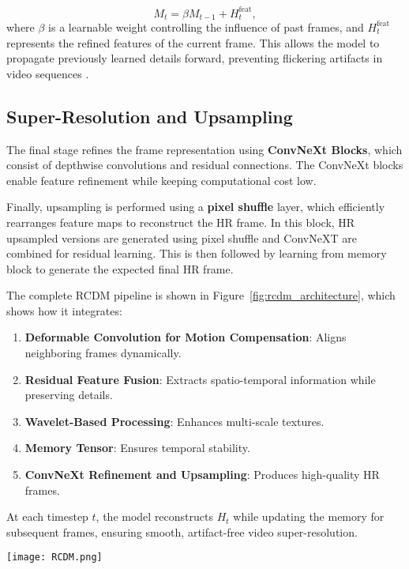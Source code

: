 \documentclass[11pt]{article}
\begin{document}
\begin{equation}
    M_t = \beta M_{t-1} + H_t^{\text{feat}},
    \label{eq:memory_update}
\end{equation}
where $\beta$ is a learnable weight controlling the influence of past frames, and $H_t^{\text{feat}}$ represents the refined features of the current frame. This allows the model to propagate previously learned details forward, preventing flickering artifacts in video sequences\cite{Chiche_2022_CVPR} \cite{chu2020learningtemporalcoherenceselfsupervision}.

\subsection{Super-Resolution and Upsampling}
The final stage refines the frame representation using \textbf{ConvNeXt Blocks}, which consist of depthwise convolutions and residual connections.\cite{liu2022convnext} The ConvNeXt blocks enable feature refinement while keeping computational cost low.

Finally, upsampling is performed using a \textbf{pixel shuffle} layer\cite{pixelshufflesr}, which efficiently rearranges feature maps to reconstruct the HR frame. 
In this block, HR upsampled versions are generated using pixel shuffle and ConvNeXT are combined for residual learning. This is then followed by learning from memory block to generate the expected final HR frame.

The complete RCDM pipeline is shown in Figure~\ref{fig:rcdm_architecture}, which shows how it integrates:
\begin{enumerate}
    \item \textbf{Deformable Convolution for Motion Compensation}: Aligns neighboring frames dynamically.
    \item \textbf{Residual Feature Fusion}: Extracts spatio-temporal information while preserving details.
    \item \textbf{Wavelet-Based Processing}: Enhances multi-scale textures.
    \item \textbf{Memory Tensor}: Ensures temporal stability.
    \item \textbf{ConvNeXt Refinement and Upsampling}: Produces high-quality HR frames.
\end{enumerate}

At each timestep $t$, the model reconstructs $H_t$ while updating the memory for subsequent frames, ensuring smooth, artifact-free video super-resolution.

\begin{figure*}[h]
    \centering
    \texttt{[image: RCDM.png]}
    \caption{Overview of the proposed RCDM architecture. The model integrates deformable convolutions, wavelet decomposition, memory propagation, and ConvNeXt refinement for efficient video super-resolution.}
    \label{fig:rcdm_architecture}
\end{figure*}
\end{document}
